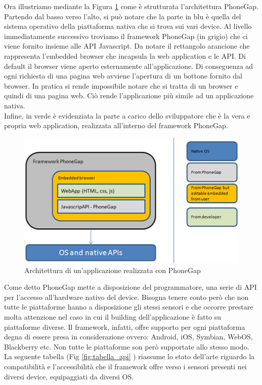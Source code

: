 \newpage
Ora illustriamo mediante la Figura \ref{fig:architettura_phonegap} come è strutturata l'architettura PhoneGap. Partendo dal basso verso l'alto, si può notare che la parte in blu è quella del sistema operativo della piattaforma nativa che si trova sui vari device. Al livello immediatamente successivo troviamo il framework PhoneGap (in grigio) che ci viene fornito insieme alle API Javascript. Da notare il rettangolo arancione che rappresenta l'embedded browser che incapsula la web application e le API. Di default il browser viene aperto esternamente all'applicazione. Di conseguenza ad ogni richiesta di una pagina web avviene l'apertura di un bottone fornito dal browser. In pratica si rende impossibile notare che si tratta di un browser e quindi di una pagina web. Ciò rende l'applicazione più simile ad un applicazione nativa.\\
Infine, in verde è evidenziata la parte a carico dello sviluppatore che è la vera e propria web application, realizzata all'interno del framework PhoneGap.
\begin{figure}[H]
	\centering
	\includegraphics[scale=0.9]{Implementazione/phonegap_architettura.jpg}
	\caption{Architettura di un'applicazione realizzata con PhoneGap}
	\label{fig:architettura_phonegap}
\end{figure}

Come detto PhoneGap mette a disposizione del programmatore, una serie di API per l'accesso all'hardware nativo del device. Bisogna tenere conto però che non tutte le piattaforme hanno a disposizione gli stessi sensori e che occorre prestare molta attenzione nel caso in cui il building dell'applicazione è fatto su piattaforme diverse. Il framework, infatti, offre supporto per ogni piattaforma degna di essere presa in considerazione ovvero: Android, iOS, Symbian, WebOS, Blackberry etc. Non tutte le piattaforme son però supportate allo stesso modo. La seguente tabella (Fig \ref{fig:tabella_api} )
riassume lo stato dell'arte riguardo la compatibilità e l'accessibilità che il framework offre verso i sensori presenti nei diversi device, equipaggiati da diversi OS.

